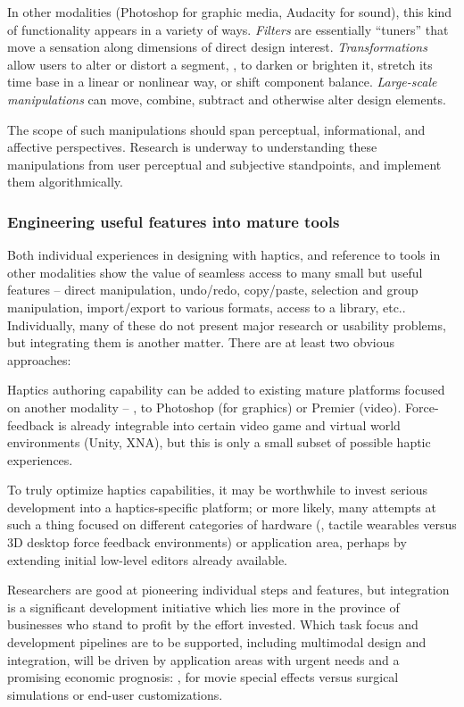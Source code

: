 In other modalities (Photoshop for graphic media, Audacity for sound), this kind of functionality appears in a variety of ways.  
\textit{Filters} are essentially ``tuners'' that move a sensation along dimensions of direct design interest.
\textit{Transformations} allow users to alter or distort a segment, \eg, to darken or brighten it,  stretch its time base in a linear or nonlinear way, or shift component balance.
%
\textit{Large-scale manipulations} can move, combine, subtract and otherwise alter design elements.

The scope of such manipulations should span perceptual, informational, and affective perspectives. Research is underway to understanding these manipulations from user perceptual and subjective standpoints, and implement them algorithmically. 


%
%
\subsubsection{Engineering useful features into mature tools} 
Both individual experiences in designing with haptics, and reference to tools in other modalities show the value of seamless access to many small but useful features --
direct manipulation, undo/redo, copy/paste, selection and group manipulation, import/export to various formats, access to a library, etc..
%
Individually, many of these do not present major research or usability problems, but integrating them is another matter. There are at least two obvious approaches:

    Haptics authoring capability can be added to existing mature platforms focused on another modality -- \eg, to Photoshop (for graphics)  or Premier (video).
    Force-feedback is already integrable into certain video game and virtual world environments (Unity, XNA), but this is only a small subset of possible haptic experiences.

    To truly optimize haptics capabilities, it may be worthwhile to invest serious development into a haptics-specific platform; or more likely, many attempts at such a thing focused on different categories of hardware (\eg, tactile wearables versus 3D desktop force feedback environments) or application area, perhaps by extending initial low-level editors already available.

\vspace{0.1in} \noindent 
Researchers are good at pioneering individual steps and features, but integration is a significant development initiative which lies more in the province of businesses who stand to profit by the effort invested. 
Which task focus and development pipelines are to be supported, including multimodal design and integration,  will be driven by application areas with urgent needs and a promising economic prognosis:  \eg, for movie special effects versus surgical simulations or end-user customizations.


